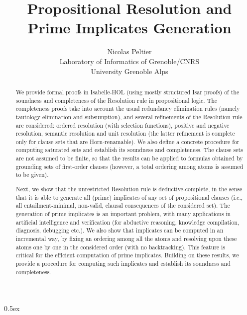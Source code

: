 \documentclass[11pt,a4paper]{article}
\begin{document}
\title{Propositional Resolution and Prime Implicates Generation}
\author{Nicolas Peltier\\Laboratory of Informatics of Grenoble/CNRS
\\University Grenoble Alps}
\maketitle

\begin{abstract}
We provide formal proofs in Isabelle-HOL (using mostly structured Isar proofs) of the soundness and completeness of the Resolution rule in propositional logic.
The completeness proofs take into account the usual redundancy elimination rules (namely tautology elimination and subsumption), and several refinements of the Resolution rule are considered: ordered resolution (with selection functions), positive and negative resolution, semantic resolution and unit resolution (the latter refinement is complete only for clause sets that are Horn-renamable). We also define a concrete procedure for computing saturated sets and establish its soundness and completeness. The clause sets are not assumed to be finite, so that the results can be applied to formulas obtained by grounding sets of first-order clauses (however, a total ordering among atoms is assumed to be given).

Next, we show that the unrestricted Resolution rule is deductive-complete, in the sense that it is able to generate all
(prime) implicates of any set of propositional clauses (i.e., all entailment-minimal, non-valid, clausal consequences of the considered set). The generation of prime implicates is an important problem, with many applications in artificial intelligence and verification (for abductive reasoning, knowledge compilation, diagnosis, debugging etc.). We also show that implicates can be computed in an incremental way, by fixing an ordering among all the atoms and resolving upon these atoms one by one in the considered order (with no backtracking). This feature is critical for the efficient computation of prime implicates. Building on these results, we provide a procedure for computing such implicates and establish its soundness and completeness.
\end{abstract}

\tableofcontents

\parindent 0pt\parskip 0.5ex



%
%
\end{document}
